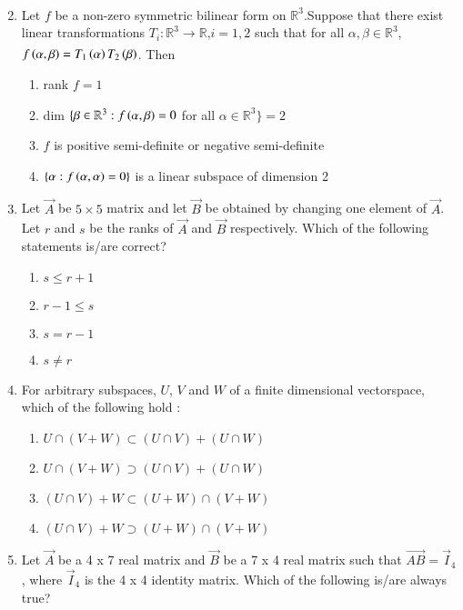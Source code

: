 \begin{enumerate}[label=\thesection.\arabic*.,ref=\thesection.\theenumi]
\begin{align*}
\end{align*}
%
\solution

\item Let $f$ be a non-zero symmetric bilinear form on $\mathbb{R}^3$.Suppose that there exist linear transformations $T_i:\mathbb{R}^3\xrightarrow[]{}\mathbb{R}$,$i=1,2$ such that for all $\alpha,\beta\in\mathbb{R}^3$, $f\left(\alpha,\beta\right)=T_1\left(\alpha\right)T_2\left(\beta\right)$. Then
\begin{enumerate}
    \item rank $f=1$
    \item dim $\{\beta\in\mathbb{R}^3:f\left(\alpha,\beta\right)=0$ for all $\alpha\in\mathbb{R}^3\}=2$
    \item $f$ is positive semi-definite or negative semi-definite
    \item $\{\alpha:f\left(\alpha,\alpha\right)=0\}$ is a linear subspace of dimension 2
\end{enumerate}
%
%
\solution

\item %
Let $\vec{A}$ be $5\times5$ matrix and let $\vec{B}$ be obtained by changing one element of $\vec{A}$. Let $r$ and $s$ be the ranks of $\vec{A}$ and $\vec{B}$ respectively. Which of the following statements is/are correct?
\begin{enumerate}
    \item $s\leq r+1$
    \item $r-1\leq s$
    \item $s=r-1$
    \item $s\neq r$
\end{enumerate}
%
%
\solution

\item For arbitrary subspaces, $U$, $V$ and $W$ of a finite dimensional vectorspace, which of the following hold :
\begin{enumerate}
    \item $U \cap (V+W) \subset (U \cap V) + (U \cap W)$
    \item $U \cap (V+W) \supset (U \cap V) + (U \cap W)$
    \item $(U \cap V) + W \subset (U+W) \cap (V+W)$
    \item $(U \cap V) + W \supset (U+W) \cap (V+W)$
\end{enumerate}
%
%
\solution

\item Let $\vec{A}$ be a 4 x 7 real matrix and $\vec{B}$ be a 7 x 4 real matrix such that $\vec{AB} = \vec{I}_4$, where $\vec{I}_4$ is the 4 x 4 identity matrix. Which of the following is/are always true?

\end{enumerate}
